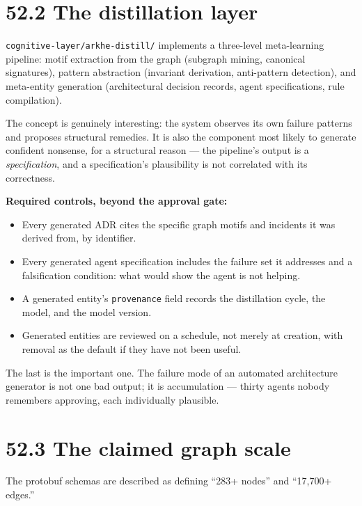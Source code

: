 \documentclass[
  11pt]{report}
\providecommand{\tightlist}{%
  \setlength{\itemsep}{0pt}\setlength{\parskip}{0pt}}
\begin{document}
\hypertarget{the-distillation-layer}{%
\section{52.2 The distillation layer}\label{the-distillation-layer}}

\texttt{cognitive-layer/arkhe-distill/} implements a three-level
meta-learning pipeline: motif extraction from the graph (subgraph
mining, canonical signatures), pattern abstraction (invariant
derivation, anti-pattern detection), and meta-entity generation
(architectural decision records, agent specifications, rule
compilation).

The concept is genuinely interesting: the system observes its own
failure patterns and proposes structural remedies. It is also the
component most likely to generate confident nonsense, for a structural
reason --- the pipeline's output is a \emph{specification}, and a
specification's plausibility is not correlated with its correctness.

\textbf{Required controls, beyond the approval gate:}

\begin{itemize}
\tightlist
\item
  Every generated ADR cites the specific graph motifs and incidents it
  was derived from, by identifier.
\item
  Every generated agent specification includes the failure set it
  addresses and a falsification condition: what would show the agent is
  not helping.
\item
  A generated entity's \texttt{provenance} field records the
  distillation cycle, the model, and the model version.
\item
  Generated entities are reviewed on a schedule, not merely at creation,
  with removal as the default if they have not been useful.
\end{itemize}

The last is the important one. The failure mode of an automated
architecture generator is not one bad output; it is accumulation ---
thirty agents nobody remembers approving, each individually plausible.

\hypertarget{the-claimed-graph-scale}{%
\section{52.3 The claimed graph scale}\label{the-claimed-graph-scale}}

The protobuf schemas are described as defining ``283+ nodes'' and
``17,700+ edges.''
\end{document}
